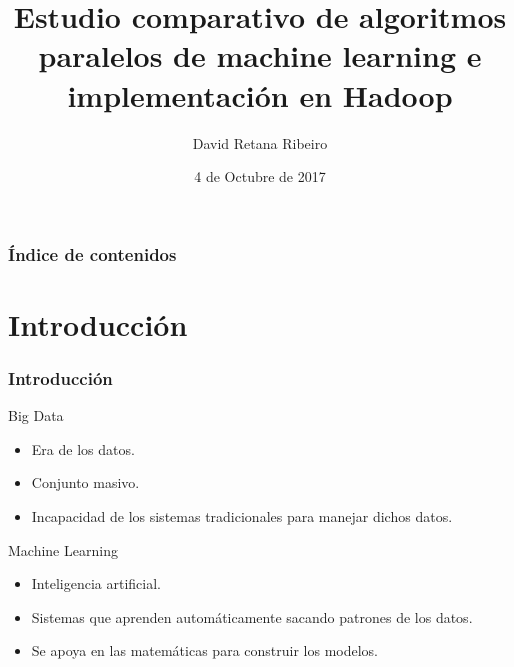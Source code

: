 \documentclass{beamer}
\title[Machine Learning y Big Data]
      {Estudio comparativo de algoritmos paralelos de machine learning e implementación en Hadoop}
\author{David Retana Ribeiro}
\institute[UCM]{Universidad Complutense de Madrid \\ \medskip \texttt{davidret@ucm.es}}
\date{4 de Octubre de 2017}
\begin{document}

\begin{frame} %
\titlepage
\end{frame}


\begin{frame} %
\frametitle{Índice de contenidos}
\tableofcontents
\end{frame}


\section{Introducción}

\begin{frame} %
  \frametitle{Introducción}
  \begin{block}{Big Data}
  \begin{itemize}
    \item Era de los datos.
    \item Conjunto masivo.
    \item Incapacidad de los sistemas tradicionales para manejar dichos datos.
  \end{itemize}
  \end{block}
  
  \begin{block}{Machine Learning}
  \begin{itemize}
    \item Inteligencia artificial.
    \item Sistemas que aprenden automáticamente sacando patrones de los datos.
    \item Se apoya en las matemáticas para construir los modelos.
  \end{itemize}
  \end{block}
\end{frame}

\end{document}
